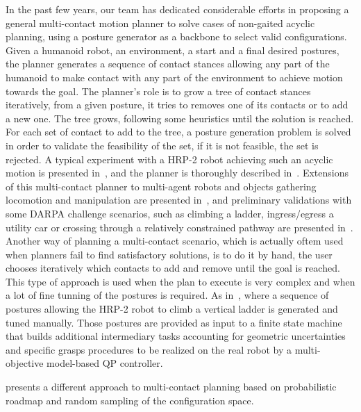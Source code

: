 In the past few years, our team has dedicated considerable efforts in proposing a general multi-contact motion planner to solve cases of non-gaited acyclic planning, using a posture generator as a backbone to select valid configurations.
Given a humanoid robot, an environment, a start and a final desired postures, the planner generates a sequence of contact stances allowing any part of the humanoid to make contact with any part of the environment to achieve motion towards the goal.
The planner's role is to grow a tree of contact stances iteratively, from a given posture, it tries to removes one of its contacts or to add a new one.
The tree grows, following some heuristics until the solution is reached.
For each set of contact to add to the tree, a posture generation problem is solved in order to validate the feasibility of the set, if it is not feasible, the set is rejected.
A typical experiment with a HRP-2 robot achieving such an acyclic motion is presented in~\cite{escande:iser:2008}, and the planner is thoroughly described in~\cite{escande:ras:2013}.
Extensions of this multi-contact planner to multi-agent robots and objects gathering locomotion and manipulation are presented in~\cite{bouyarmane:ar:2012}, and preliminary validations with some DARPA challenge scenarios, such as climbing a ladder, ingress/egress a utility car or crossing through a relatively constrained pathway are presented in~\cite{bouyarmane:humanoids:2012}.
Another way of planning a multi-contact scenario, which is actually oftem used when planners fail to find satisfactory solutions, is to do it by hand, the user chooses iteratively which contacts to add and remove until the goal is reached.
This type of approach is used when the plan to execute is very complex and when a lot of fine tunning of the postures is required.
As in~\cite{vaillant:autonomousrobots:2016}, where a sequence of postures allowing the HRP-2 robot to climb a vertical ladder is generated and tuned manually.
Those postures are provided as input to a finite state machine that builds additional intermediary tasks accounting for geometric uncertainties and specific grasps procedures to be realized on the real robot by a multi-objective model-based QP controller.

\cite{hauser:issr:2007} presents a different approach to multi-contact planning based on probabilistic roadmap and random sampling of the configuration space.


